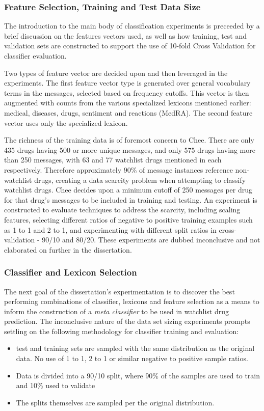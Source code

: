\documentclass[twoside,11pt]{article}
\begin{document}
\subsubsection{Feature Selection, Training and Test Data Size}
The introduction to the main body of classification experiments is preceeded by a brief discussion on the features vectors used, as well as how training, test and validation sets are constructed to support the use of 10-fold Cross Validation for classifier evaluation.

Two types of feature vector are decided upon and then leveraged in the  experiments. The first feature vector type is generated over general vocabulary terms in the messages, selected based on frequency cutoffs. This vector is then augmented with counts from the various specialized lexicons mentioned earlier: medical, diseases, drugs, sentiment and reactions (MedRA). The second feature vector uses only the specialized lexicon.

The richness of the training data is of foremost concern to Chee. There are only 435 drugs having 500 or more unique messages, and only 575 drugs having more than 250 messages, with 63 and 77 watchlist drugs mentioned in each respectively. Therefore approximately 90\% of message instances reference non-watchlist drugs, creating a data scarcity problem when attempting to classify watchlist drugs. Chee decides upon a minimum cutoff of 250 messages per drug for that drug's messages to be included in training and testing. An  experiment is constructed to evaluate techniques to address the scarcity, including scaling features, selecting different ratios of negative to positive training examples such as 1 to 1 and 2 to 1, and experimenting with different split ratios in cross-validation - 90/10 and 80/20. These experiments are dubbed inconclusive and not elaborated on further in the dissertation.

\subsubsection{Classifier and Lexicon Selection}
The next goal of the dissertation's experimentation is to discover the best performing combinations of classifier, lexicons and feature selection as a means to inform the construction of a \textit{meta classifier} to be used in watchlist drug prediction. The inconclusive nature of the data set sizing experiments prompts settling on the following methodology for classifier
training and evaluation:
\begin{itemize}
  \item test and training sets are sampled with the same distribution as the original data. No use of 1 to 1, 2 to 1 or similar negative to positive sample ratios.
  \item Data is divided into a 90/10 split, where 90\% of the samples are used to train and 10\% used to validate
  \item The splits themselves are sampled per the original distribution.
\end{itemize}
\end{document}
